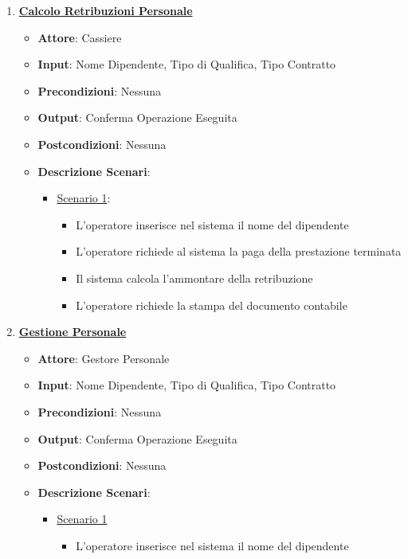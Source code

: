 \begin{enumerate}
\begin{itemize}
    \end{itemize}
    \item \uline {{\bf Calcolo Retribuzioni Personale}}
    \begin{itemize}
        \item {\bf Attore}: Cassiere
        \item {\bf Input}: Nome Dipendente, Tipo di Qualifica, Tipo Contratto 
        \item {\bf Precondizioni}: Nessuna
        \item {\bf Output}: Conferma Operazione Eseguita
        \item {\bf Postcondizioni}: Nessuna
        \item {\bf Descrizione Scenari}:
        \begin{itemize}
            \item \uline{Scenario 1}:
            \begin{itemize}
                \item L'operatore inserisce nel sistema il nome del dipendente
                \item L'operatore richiede al sistema la paga della prestazione terminata
                \item Il sistema calcola l'ammontare della retribuzione
                \item L'operatore richiede la stampa del documento contabile
            \end{itemize}
        \end{itemize}
    \end{itemize}
    \item \uline {{\bf Gestione Personale}}
    \begin{itemize} 
        \item {\bf Attore}: Gestore Personale
        \item {\bf Input}: Nome Dipendente, Tipo di Qualifica, Tipo Contratto
        \item {\bf Precondizioni}: Nessuna
        \item {\bf Output}: Conferma Operazione Eseguita
        \item {\bf Postcondizioni}: Nessuna
        \item {\bf Descrizione Scenari}:
        \begin{itemize}
            \item \uline{Scenario 1}
            \begin{itemize}
                \item L'operatore inserisce nel sistema il nome del dipendente

\end{itemize}
\end{itemize}
\end{itemize}
\end{enumerate}
